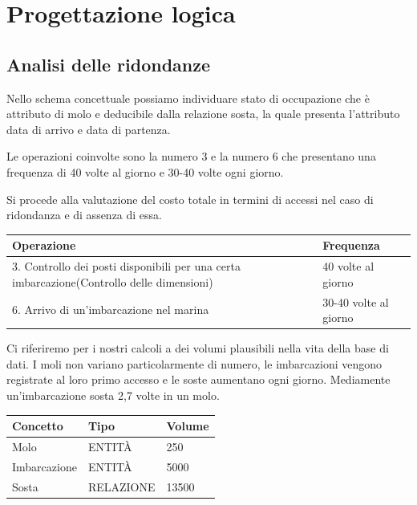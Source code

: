 \section{Progettazione logica}

\subsection{Analisi delle ridondanze}
Nello schema concettuale possiamo individuare stato di occupazione che è attributo di molo e deducibile dalla relazione sosta, la quale presenta l'attributo data di arrivo e data di partenza.

Le operazioni coinvolte sono la numero 3 e la numero 6 che presentano una frequenza di 40 volte al giorno e 30-40 volte ogni giorno.

Si procede alla valutazione del costo totale in termini di accessi nel caso di ridondanza e di assenza di essa.

\begin{center}
    \begin{tabularx}{\textwidth}{|p{90mm}|X|}
        \hline
        \rowcolor{gray!30}
        \textbf{Operazione} & \textbf{Frequenza}\\
        \hline
        3. Controllo dei posti disponibili per una certa imbarcazione(Controllo delle dimensioni)& 40 volte al giorno\\
        \hline
        6. Arrivo di un'imbarcazione nel marina & 30-40 volte al giorno\\
        \hline
    \end{tabularx}
\end{center}

Ci riferiremo per i nostri calcoli a dei volumi plausibili nella vita della base di dati. I moli non variano particolarmente di numero, le imbarcazioni vengono registrate al loro primo accesso e le soste aumentano ogni giorno. Mediamente un'imbarcazione sosta 2,7 volte in un molo.

\begin{center}
    \begin{tabularx}{\textwidth}{|X|X|X|}
        \hline
        \rowcolor{gray!30}
        \textbf{Concetto} & \textbf{Tipo} & \textbf{Volume}\\
        \hline
        Molo & ENTITÀ & 250\\
        \hline
        Imbarcazione & ENTITÀ & 5000\\
        \hline
        Sosta & RELAZIONE & 13500\\ %
        \hline
    \end{tabularx}
\end{center}

